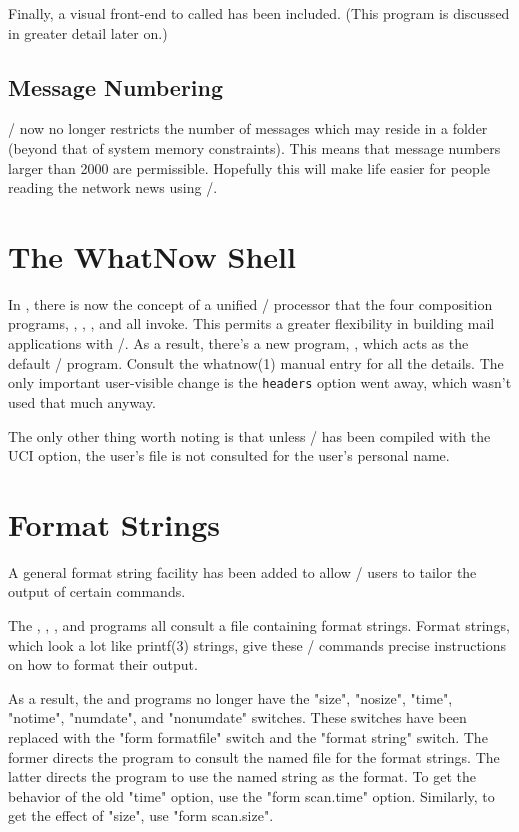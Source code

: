 Finally, a visual front-end to  called  has been included.
(This program is discussed in greater detail later on.)

\subsection*	{Message Numbering}
\MH/ now no longer restricts the number of messages which may reside in a
folder
(beyond that of system memory constraints).
This means that message numbers larger than 2000 are permissible.
Hopefully this will make life easier for people reading the network news
using \MH/.

\section*	{The WhatNow Shell}
In ,
there is now the concept of a unified \whatnow/ processor that
the four composition programs, , , ,
and  all invoke.
This permits a greater flexibility in building mail applications with \MH/.
As a result, there's a new program, , which acts as the default
\whatnow/ program.
Consult the \man whatnow(1) manual entry for all the details.
The only important user-visible change is the \verb"headers" option went away,
which wasn't used that much anyway.


The only other thing worth noting is that unless \MH/ has been compiled with
the UCI option,
the user's  file is not consulted for the user's
personal name.

\section*	{Format Strings}
A general format string facility has been added to allow \MH/ users to tailor
the output of certain commands.

The , , , and  programs all consult a
file containing format strings.
Format strings,
which look a lot like \man printf(3) strings,
give these \MH/ commands precise instructions on how to format their output.

As a result,
the  and  programs no longer have the
\switch"size", \switch"nosize",
\switch"time", \switch"notime",
\switch"numdate", and \switch"nonumdate"
switches.
These switches have been replaced with the
\switch"form formatfile" switch and the \switch"format string" switch.
The former directs the program to consult the named file for the format
strings.
The latter directs the program to use the named string as the format.
To get the behavior of the old \switch"time" option,
use the \switch"form scan.time" option.
Similarly,
to get the effect of \switch"size",
use \switch"form scan.size".

